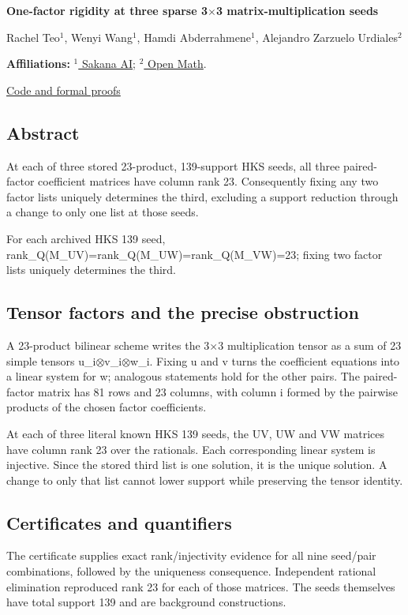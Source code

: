 \documentclass[11pt,a4paper]{article}
\begin{document}
{\LARGE\bfseries One-factor rigidity at three sparse 3\ensuremath{\times}3 matrix-multiplication seeds\par}\medskip
{\small Rachel Teo\ensuremath{^1}, Wenyi Wang\ensuremath{^1}, Hamdi Abderrahmene\ensuremath{^1}, Alejandro Zarzuelo Urdiales\ensuremath{^2}\par}\medskip
{\small\textbf{Affiliations:} \href{https://sakana.ai/}{\ensuremath{^1} Sakana AI}; \href{https://rsihouse.ai/openmath}{\ensuremath{^2} Open Math}.\par}

{\small\href{https://github.com/alejandrozu/openmath-2026-judging}{Code and formal proofs}\par}

\subsection{Abstract}
At each of three stored 23-product, 139-support HKS seeds, all three paired-factor coefficient matrices have column rank 23. Consequently fixing any two factor lists uniquely determines the third, excluding a support reduction through a change to only one list at those seeds.

For each archived HKS 139 seed, rank\_Q(M\_UV)=rank\_Q(M\_UW)=rank\_Q(M\_VW)=23; fixing two factor lists uniquely determines the third.

\subsection{Tensor factors and the precise obstruction}
A 23-product bilinear scheme writes the 3\ensuremath{\times}3 multiplication tensor as a sum of 23 simple tensors u\_i\ensuremath{\otimes}v\_i\ensuremath{\otimes}w\_i. Fixing u and v turns the coefficient equations into a linear system for w; analogous statements hold for the other pairs. The paired-factor matrix has 81 rows and 23 columns, with column i formed by the pairwise products of the chosen factor coefficients.

At each of three literal known HKS 139 seeds, the UV, UW and VW matrices have column rank 23 over the rationals. Each corresponding linear system is injective. Since the stored third list is one solution, it is the unique solution. A change to only that list cannot lower support while preserving the tensor identity.

\subsection{Certificates and quantifiers}
The certificate supplies exact rank/injectivity evidence for all nine seed/pair combinations, followed by the uniqueness consequence. Independent rational elimination reproduced rank 23 for each of those matrices. The seeds themselves have total support 139 and are background constructions.
\end{document}
